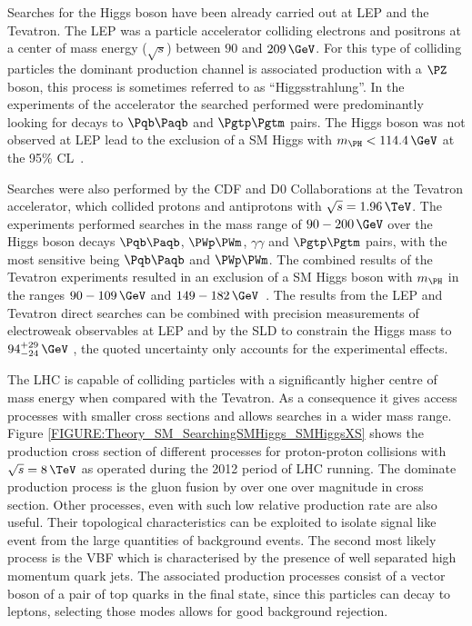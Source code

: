 Searches for the Higgs boson have been already carried out at \gls{LEP} and the Tevatron. The \gls{LEP} was a particle accelerator colliding electrons and positrons at a center of mass energy ($\sqrt{s}$) between $90$ and $209\,\GeV$. For this type of colliding particles the dominant production channel is associated production with a $\PZ$ boson, this process is sometimes referred to as ``Higgsstrahlung''. In the experiments of the accelerator the searched performed were predominantly looking for decays to $\Pqb\Paqb$ and $\Pgtp\Pgtm$ pairs. The Higgs boson was not observed at \gls{LEP} lead to the exclusion of a \gls{SM} Higgs with $m_{\PH}<114.4\,\GeV$ at the 95\% \gls{CL}~\cite{ARTICLE:LEPWorkingGroupforHiggsBosonSearches}.

Searches were also performed by the CDF and D0 Collaborations at the Tevatron accelerator, which collided protons and antiprotons with $\sqrt{s}=1.96\,\TeV$. The experiments performed searches in the mass range of $90-200\,\GeV$ over the Higgs boson decays $\Pqb\Paqb$, $\PWp\PWm$, $\gamma\gamma$ and $\Pgtp\Pgtm$ pairs, with the most sensitive being $\Pqb\Paqb$ and $\PWp\PWm$. The combined results of the Tevatron experiments resulted in an exclusion of a \gls{SM} Higgs boson with $m_{\PH}$ in the ranges $90-109\,\GeV$ and $149-182\,\GeV$~\cite{ARTICLE:CDFDOHiggsBosonStudies}. The results from the \gls{LEP} and Tevatron direct searches can be combined with precision measurements of electroweak observables at \gls{LEP} and by the \gls{SLD} to constrain the Higgs mass to $94^{+29}_{-24}\,\GeV$ \cite{SITE:lepewwg}, the quoted uncertainty only accounts for the experimental effects.

The \gls{LHC} is capable of colliding particles with a significantly higher centre of mass energy when compared with the Tevatron. As a consequence it gives access processes with smaller cross sections and allows searches in a wider mass range. Figure \ref{FIGURE:Theory_SM_SearchingSMHiggs_SMHiggsXS} shows the production cross section of different processes for proton-proton collisions with $\sqrt{s}=8\,\TeV$ as operated during the 2012 period of \gls{LHC} running. The dominate production process is the gluon fusion by over one over magnitude in cross section. Other processes, even with such low relative production rate are also useful. Their topological characteristics can be exploited to isolate signal like event from the large quantities of background events. The second most likely process is the \gls{VBF} which is characterised by the presence of well separated high momentum quark jets. The associated production processes consist of a vector boson of a pair of top quarks in the final state, since this particles can decay to leptons, selecting those modes allows for good background rejection. 


